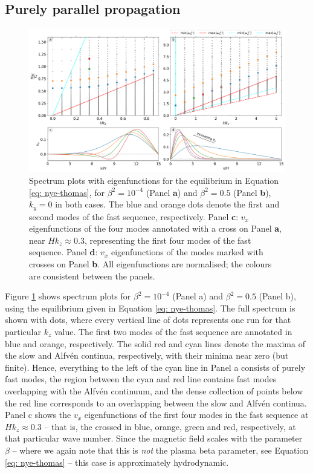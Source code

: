 \subsection{Purely parallel propagation} \label{ss: parallel_propagation}
\begin{figure}[t]
  \centering
  \includegraphics[width=\textwidth]{nye_thomas_ky0.png}
  \caption{
    Spectrum plots with eigenfunctions for the equilibrium in Equation \eqref{eq: nye-thomas}, for $\beta^2 = 10^{-4}$ (Panel \textbf{a}) and $\beta^2 = 0.5$ (Panel \textbf{b}), $k_y = 0$ in both cases. The blue and orange dots denote the first and second modes of the fast sequence, respectively. Panel \textbf{c}: $v_x$ eigenfunctions of the four modes annotated with a cross on Panel \textbf{a}, near $Hk_z \approx 0.3$, representing the first four modes of the fast sequence. Panel \textbf{d}: $v_x$ eigenfunctions of the modes marked with crosses on Panel \textbf{b}.
    All eigenfunctions are normalised; the colours are consistent between the panels.
  }
  \label{fig: nye-thomas-ky0}
\end{figure}

Figure \ref{fig: nye-thomas-ky0} shows spectrum plots for $\beta^2 = 10^{-4}$ (Panel a) and $\beta^2 = 0.5$ (Panel b), using the equilibrium given in Equation \eqref{eq: nye-thomas}. The full spectrum is shown with dots, where every vertical line of dots represents one {\legolas} run for that particular $k_z$ value. The first two modes of the fast sequence are annotated in blue and orange, respectively. The solid red and cyan lines denote the maxima of the slow and Alfv\'en continua, respectively, with their minima near zero (but finite). Hence, everything to the left of the cyan line in Panel a consists of purely fast modes, the region between the cyan and red line contains fast modes overlapping with the Alfv\'en continuum, and the dense collection of points below the red line corresponds to an overlapping between the slow and Alfv\'en continua. Panel c shows the $v_x$ eigenfunctions of the first four modes in the fast sequence at $H k_z \approx 0.3$ -- that is, the crossed in blue, orange, green and red, respectively, at that particular wave number. Since the magnetic field scales with the parameter $\beta$ -- where we again note that this is \emph{not} the plasma beta parameter, see Equation \eqref{eq: nye-thomas} -- this case is approximately hydrodynamic.


